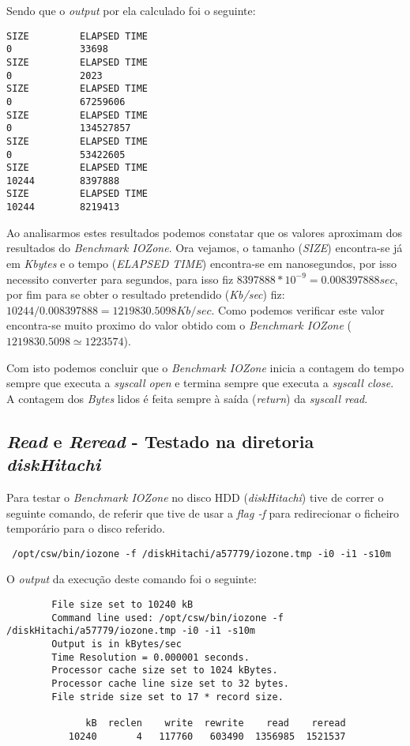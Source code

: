 \documentclass[conference,compsoc]{IEEEtran}
\begin{document}
Sendo que o \textit{output} por ela calculado foi o seguinte:

 \begin{lstlisting}
SIZE         ELAPSED TIME
0            33698
SIZE         ELAPSED TIME
0            2023
SIZE         ELAPSED TIME
0            67259606
SIZE         ELAPSED TIME
0            134527857
SIZE         ELAPSED TIME
0            53422605
SIZE         ELAPSED TIME
10244        8397888
SIZE         ELAPSED TIME
10244        8219413
\end{lstlisting}

Ao analisarmos estes resultados podemos constatar que os valores aproximam dos resultados do \textit{Benchmark IOZone}. Ora vejamos, o tamanho (\textit{SIZE}) encontra-se já em \textit{Kbytes} e o tempo (\textit{ELAPSED TIME}) encontra-se em nanosegundos, por isso necessito converter para segundos, para isso fiz $8397888*10^{-9} = 0.008397888 sec$, por fim para se obter o resultado pretendido (\textit{Kb/sec}) fiz: $10244/0.008397888= 1219830.5098 Kb/sec$. Como podemos verificar este valor encontra-se muito proximo do valor obtido com o \textit{Benchmark IOZone} ($1219830.5098 \simeq 1223574$).

Com isto podemos concluir que o \textit{Benchmark IOZone} inicia a contagem do tempo sempre que executa a \textit{syscall open} e termina sempre que executa a \textit{syscall close}. A contagem dos \textit{Bytes} lidos é feita sempre à saída (\textit{return}) da \textit{syscall read}.


\subsection{\textit{Read} e \textit{Reread} - Testado na diretoria \textit{diskHitachi}}

Para testar o \textit{Benchmark IOZone} no disco HDD (\textit{diskHitachi}) tive de correr o seguinte comando, de referir que tive de usar a \textit{flag -f} para redirecionar o ficheiro temporário para o disco referido.

 \begin{lstlisting}
 /opt/csw/bin/iozone -f /diskHitachi/a57779/iozone.tmp -i0 -i1 -s10m
 \end{lstlisting}

O \textit{output} da execução deste comando foi o seguinte:

 \begin{lstlisting}
        File size set to 10240 kB
        Command line used: /opt/csw/bin/iozone -f /diskHitachi/a57779/iozone.tmp -i0 -i1 -s10m
        Output is in kBytes/sec
        Time Resolution = 0.000001 seconds.
        Processor cache size set to 1024 kBytes.
        Processor cache line size set to 32 bytes.
        File stride size set to 17 * record size.
                                                                                                  
              kB  reclen    write  rewrite    read    reread    
           10240       4   117760   603490  1356985  1521537 
\end{lstlisting}
\end{document}

